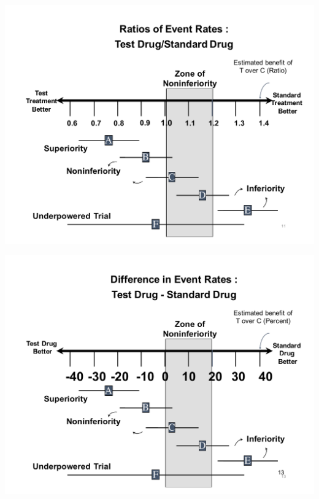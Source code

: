 \documentclass[ignorenonframetext,]{beamer}
\begin{document}
\begin{frame}{}

\includegraphics{figures/ni_ci_rr_full.pdf}

\end{frame}

\begin{frame}{}

\includegraphics{figures/ni_ci_diff.pdf}

\end{frame}
\end{document}

